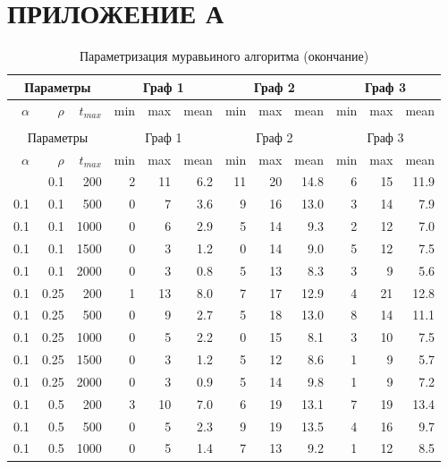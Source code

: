 \documentclass[a4paper, 12pt]{extreport}
\begin{document}
\chapter*{ПРИЛОЖЕНИЕ А}

\begin{longtable}{|r|r|r|r|r|r|r|r|r|r|r|r|}
\caption{Параметризация муравьиного алгоритма (начало)}\label{tbl:param} \\ 
\hline
\multicolumn{3}{|c|}{Параметры} & \multicolumn{3}{|c|}{Граф 1} & \multicolumn{3}{|c|}{Граф 2} & \multicolumn{3}{|c|}{Граф 3} \\
\hline
$\alpha$ & $\rho$ & $t_{max}$ & min & max & mean & min & max & mean & min & max & mean \\
\hline\endfirsthead
\caption{Параметризация муравьиного алгоритма (продолжение)} \\ 
\hline
\multicolumn{3}{|c|}{Параметры} & \multicolumn{3}{|c|}{Граф 1} & \multicolumn{3}{|c|}{Граф 2} & \multicolumn{3}{|c|}{Граф 3} \\
\hline
$\alpha$ & $\rho$ & $t_{max}$ & min & max & mean & min & max & mean & min & max & mean \\
\hline\endhead
\hline
\endfoot
\caption{Параметризация муравьиного алгоритма (окончание)}
\endlastfoot
\hline
0.1 & 0.1 & 200 & 2 & 11 & 6.2 & 11 & 20 & 14.8 & 6 & 15 & 11.9 \\ 
0.1 & 0.1 & 500 & 0 & 7 & 3.6 & 9 & 16 & 13.0 & 3 & 14 & 7.9 \\ 
0.1 & 0.1 & 1000 & 0 & 6 & 2.9 & 5 & 14 & 9.3 & 2 & 12 & 7.0 \\ 
0.1 & 0.1 & 1500 & 0 & 3 & 1.2 & 0 & 14 & 9.0 & 5 & 12 & 7.5 \\ 
0.1 & 0.1 & 2000 & 0 & 3 & 0.8 & 5 & 13 & 8.3 & 3 & 9 & 5.6 \\ 
\hline
0.1 & 0.25 & 200 & 1 & 13 & 8.0 & 7 & 17 & 12.9 & 4 & 21 & 12.8 \\ 
0.1 & 0.25 & 500 & 0 & 9 & 2.7 & 5 & 18 & 13.0 & 8 & 14 & 11.1 \\ 
0.1 & 0.25 & 1000 & 0 & 5 & 2.2 & 0 & 15 & 8.1 & 3 & 10 & 7.5 \\ 
0.1 & 0.25 & 1500 & 0 & 3 & 1.2 & 5 & 12 & 8.6 & 1 & 9 & 5.7 \\ 
0.1 & 0.25 & 2000 & 0 & 3 & 0.9 & 5 & 14 & 9.8 & 1 & 9 & 7.2 \\ 
\hline
0.1 & 0.5 & 200 & 3 & 10 & 7.0 & 6 & 19 & 13.1 & 7 & 19 & 13.4 \\ 
0.1 & 0.5 & 500 & 0 & 5 & 2.3 & 9 & 19 & 13.5 & 4 & 16 & 9.7 \\ 
0.1 & 0.5 & 1000 & 0 & 5 & 1.4 & 7 & 13 & 9.2 & 1 & 12 & 8.5 \\ 

\end{longtable}
\end{document}
